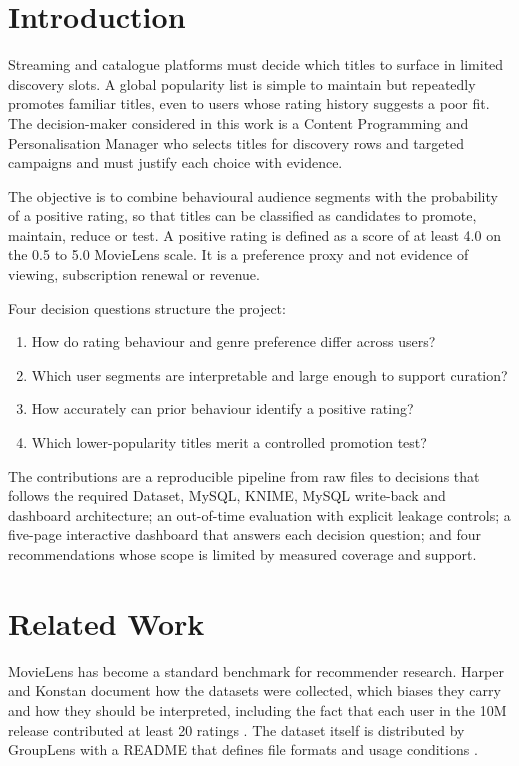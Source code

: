 \documentclass[conference]{IEEEtran}
\begin{document}
\section{Introduction}
Streaming and catalogue platforms must decide which titles to surface in limited discovery slots. A global popularity list is simple to maintain but repeatedly promotes familiar titles, even to users whose rating history suggests a poor fit. The decision-maker considered in this work is a Content Programming and Personalisation Manager who selects titles for discovery rows and targeted campaigns and must justify each choice with evidence.

The objective is to combine behavioural audience segments with the probability of a positive rating, so that titles can be classified as candidates to promote, maintain, reduce or test. A positive rating is defined as a score of at least 4.0 on the 0.5 to 5.0 MovieLens scale. It is a preference proxy and not evidence of viewing, subscription renewal or revenue.

Four decision questions structure the project:
\begin{enumerate}
\item How do rating behaviour and genre preference differ across users?
\item Which user segments are interpretable and large enough to support curation?
\item How accurately can prior behaviour identify a positive rating?
\item Which lower-popularity titles merit a controlled promotion test?
\end{enumerate}

The contributions are a reproducible pipeline from raw files to decisions that follows the required Dataset, MySQL, KNIME, MySQL write-back and dashboard architecture; an out-of-time evaluation with explicit leakage controls; a five-page interactive dashboard that answers each decision question; and four recommendations whose scope is limited by measured coverage and support.

\section{Related Work}
MovieLens has become a standard benchmark for recommender research. Harper and Konstan document how the datasets were collected, which biases they carry and how they should be interpreted, including the fact that each user in the 10M release contributed at least 20 ratings \cite{b2}. The dataset itself is distributed by GroupLens with a README that defines file formats and usage conditions \cite{b1}.
\end{document}
